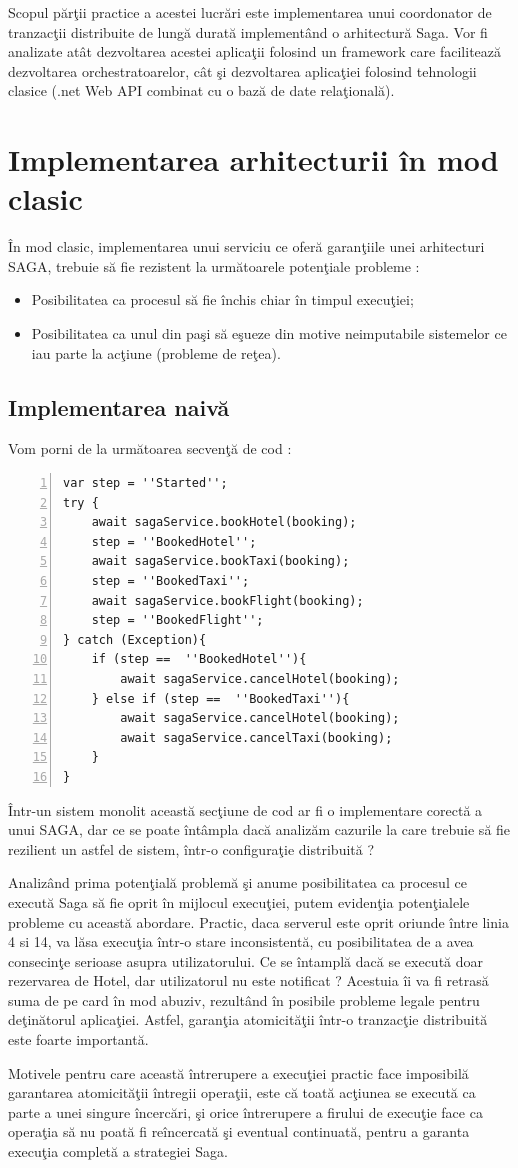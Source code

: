 \par Scopul părţii practice a acestei lucrări este implementarea unui coordonator de tranzacţii distribuite de lungă durată implementând o arhitectură Saga. Vor fi analizate atât dezvoltarea acestei aplicaţii folosind un framework care facilitează dezvoltarea orchestratoarelor, cât şi dezvoltarea aplicaţiei folosind tehnologii clasice (.net Web API  combinat cu o bază de date relaţională). 
\section{Implementarea arhitecturii în mod clasic}
\par În mod clasic, implementarea unui serviciu ce oferă garanţiile unei arhitecturi SAGA, trebuie să fie rezistent la următoarele potenţiale probleme :
\begin{itemize}
\item Posibilitatea ca procesul să fie închis chiar în timpul execuţiei;
\item Posibilitatea ca unul din paşi să eşueze din motive neimputabile sistemelor ce iau parte la acţiune (probleme de reţea).
\end{itemize}
\subsection{Implementarea naivă}
Vom porni de la următoarea secvenţă de cod : 
\begin{Verbatim}[numbers=left]
var step = ''Started'';
try {
	await sagaService.bookHotel(booking);
	step = ''BookedHotel'';
	await sagaService.bookTaxi(booking);
	step = ''BookedTaxi'';
	await sagaService.bookFlight(booking);
	step = ''BookedFlight'';
} catch (Exception){
	if (step ==  ''BookedHotel''){
		await sagaService.cancelHotel(booking);
	} else if (step ==  ''BookedTaxi''){
		await sagaService.cancelHotel(booking);
		await sagaService.cancelTaxi(booking);
	}
}
\end{Verbatim}
Într-un sistem monolit această secţiune de cod ar fi o implementare corectă a unui SAGA, dar ce se poate întâmpla dacă analizăm cazurile la care trebuie să fie rezilient un astfel de sistem, într-o configuraţie distribuită ? 
\par Analizând prima potenţială problemă şi anume posibilitatea ca procesul ce execută Saga să fie oprit în mijlocul execuţiei, putem evidenţia potenţialele probleme cu această abordare. Practic, daca serverul este oprit oriunde între linia 4 si 14, va lăsa execuţia într-o stare inconsistentă, cu posibilitatea de a avea consecinţe serioase asupra utilizatorului. Ce se întamplă dacă se execută doar rezervarea de Hotel, dar utilizatorul nu este notificat ? Acestuia îi va fi retrasă suma de pe card în mod abuziv, rezultând în posibile probleme legale pentru deţinătorul aplicaţiei. Astfel, garanţia atomicităţii într-o tranzacţie distribuită este foarte importantă. 
\par Motivele pentru care această întrerupere a execuţiei practic face imposibilă garantarea atomicităţii întregii operaţii, este că toată acţiunea se execută ca parte a unei singure încercări, şi orice întrerupere a firului de execuţie face ca operaţia să nu poată fi reîncercată şi eventual continuată, pentru a garanta execuţia completă a strategiei Saga. 

